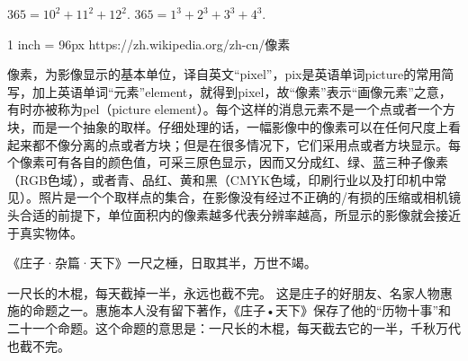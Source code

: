 \documentclass[main.tex]{subfiles}
\begin{document}
$365=10^2+11^2+12^2$.
$365=1^3+2^3+3^3+4^3$.


1 inch = 96px
https://zh.wikipedia.org/zh-cn/像素

像素，为影像显示的基本单位，译自英文“pixel”，pix是英语单词picture的常用简写，加上英语单词“元素”element，就得到pixel，故“像素”表示“画像元素”之意，有时亦被称为pel（picture element）。每个这样的消息元素不是一个点或者一个方块，而是一个抽象的取样。仔细处理的话，一幅影像中的像素可以在任何尺度上看起来都不像分离的点或者方块；但是在很多情况下，它们采用点或者方块显示。每个像素可有各自的颜色值，可采三原色显示，因而又分成红、绿、蓝三种子像素（RGB色域），或者青、品红、黄和黑（CMYK色域，印刷行业以及打印机中常见）。照片是一个个取样点的集合，在影像没有经过不正确的/有损的压缩或相机镜头合适的前提下，单位面积内的像素越多代表分辨率越高，所显示的影像就会接近于真实物体。


《庄子·杂篇·天下》一尺之棰，日取其半，万世不竭。

一尺长的木棍，每天截掉一半，永远也截不完。
这是庄子的好朋友、名家人物惠施的命题之一。惠施本人没有留下著作，《庄子•天下》保存了他的“历物十事”和二十一个命题。这个命题的意思是：一尺长的木棍，每天截去它的一半，千秋万代也截不完。
\end{document}
